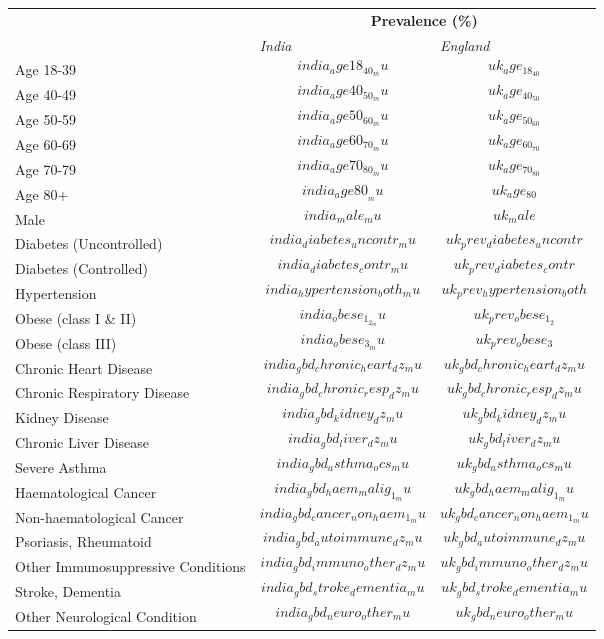 
\begin{tabular}{p{6cm}p{1.1cm}p{1cm}}
& \multicolumn{2}{c}{\textbf{Prevalence (\%)  }} \\[0.5ex] & \emph{India} & \emph{England} \\[2ex]
Age 18-39 & $$india_age18_40_mu$$ & $$uk_age_18_40$$ \\[0.25ex]
Age 40-49 & $$india_age40_50_mu$$ & $$uk_age_40_50$$ \\[0.25ex]
Age 50-59 & $$india_age50_60_mu$$ & $$uk_age_50_60$$\\[0.25ex]
Age 60-69 & $$india_age60_70_mu$$ & $$uk_age_60_70$$\\[0.25ex]
Age 70-79 & $$india_age70_80_mu$$ & $$uk_age_70_80$$\\[0.25ex]
Age 80+ & $$india_age80__mu$$ & $$uk_age_80$$ \\[0.25ex]
Male & $$india_male_mu$$ & $$uk_male$$ \\[0.25ex]
Diabetes (Uncontrolled) & $$india_diabetes_uncontr_mu$$ & $$uk_prev_diabetes_uncontr$$ \\[0.25ex]
Diabetes (Controlled) & $$india_diabetes_contr_mu$$ & $$uk_prev_diabetes_contr$$ \\[0.25ex]
Hypertension & $$india_hypertension_both_mu$$ & $$uk_prev_hypertension_both$$ \\[0.25ex]
Obese (class I \& II) & $$india_obese_1_2_mu$$ & $$uk_prev_obese_1_2$$ \\[0.25ex]
Obese (class III) & $$india_obese_3_mu$$ & $$uk_prev_obese_3$$ \\[0.25ex]
Chronic Heart Disease & $$india_gbd_chronic_heart_dz_mu$$ & $$uk_gbd_chronic_heart_dz_mu$$ \\[0.25ex]
Chronic Respiratory Disease & $$india_gbd_chronic_resp_dz_mu$$ & $$uk_gbd_chronic_resp_dz_mu$$ \\[0.25ex]
Kidney Disease & $$india_gbd_kidney_dz_mu$$ & $$uk_gbd_kidney_dz_mu$$ \\[0.25ex]
Chronic Liver Disease & $$india_gbd_liver_dz_mu$$ & $$uk_gbd_liver_dz_mu$$ \\[0.25ex]
Severe Asthma & $$india_gbd_asthma_ocs_mu$$ & $$uk_gbd_asthma_ocs_mu$$ \\[0.25ex]
Haematological Cancer & $$india_gbd_haem_malig_1_mu$$ & $$uk_gbd_haem_malig_1_mu$$\\[0.25ex]
Non-haematological Cancer & $$india_gbd_cancer_non_haem_1_mu$$ & $$uk_gbd_cancer_non_haem_1_mu$$ \\[0.25ex]
Psoriasis, Rheumatoid & $$india_gbd_autoimmune_dz_mu$$ & $$uk_gbd_autoimmune_dz_mu$$ \\[0.25ex]
Other Immunosuppressive Conditions & $$india_gbd_immuno_other_dz_mu$$ & $$uk_gbd_immuno_other_dz_mu$$ \\[0.25ex]
Stroke, Dementia & $$india_gbd_stroke_dementia_mu$$ & $$uk_gbd_stroke_dementia_mu$$ \\[0.25ex]
Other Neurological Condition & $$india_gbd_neuro_other_mu$$ & $$uk_gbd_neuro_other_mu$$ \\[0.25ex]
\end{tabular}

